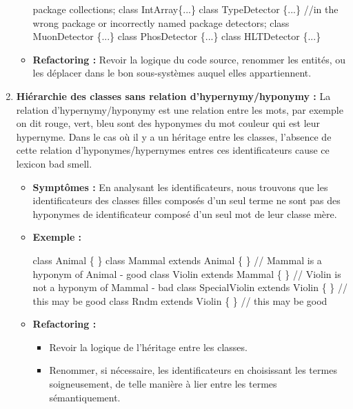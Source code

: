 \begin{enumerate}
\begin{itemize}
\begin{framed}
{ package collections;\newline
   class IntArray\{...\} \newline
   class TypeDetector \{...\} //in the wrong package or incorrectly named 
 package detectors;\newline
   class MuonDetector \{...\}\newline
   class PhosDetector \{...\}\newline
   class HLTDetector \{...\}\newline
   }
\end{framed}
\item \textbf {Refactoring :}
Revoir la logique du code source, renommer les entités, ou les déplacer dans le bon sous-systèmes auquel elles appartiennent.
\end{itemize}
\item \textbf {Hiérarchie des classes sans relation d’hypernymy/hyponymy :}
La relation d’hypernymy/hyponymy est une relation entre les mots, par exemple on dit rouge, vert, bleu sont des hyponymes du mot couleur qui est leur hypernyme.
Dans le cas où il y a un héritage entre les classes, l’absence de  cette relation d’hyponymes/hypernymes entres ces identificateurs cause ce lexicon bad smell.
\begin{itemize}
\item \textbf {Symptômes :}
En analysant les identificateurs, nous trouvons que les identificateurs des classes filles composés d’un seul terme ne sont pas des hyponymes de identificateur composé d’un seul mot de leur classe mère.
\item \textbf {Exemple :}
\begin{framed}
    {\selectfont 

class Animal \{  \}
 class Mammal extends Animal \{  \} // Mammal is a hyponym of Animal - good\newline
 class Violin extends Mammal \{  \}  // Violin is not a hyponym of Mammal - bad\newline
 class SpecialViolin extends Violin \{  \} // this may be good\newline
 class Rndm extends Violin \{  \} // this may be good\newline
 }
 \end{framed}
\item \textbf {Refactoring :}
\begin{itemize}

\item Revoir la logique de l’héritage entre les classes.
\item Renommer, si nécessaire, les identificateurs en choisissant les termes soigneusement, de telle manière à lier entre les termes sémantiquement.
\end{itemize}
\end{itemize}
\end{enumerate}
